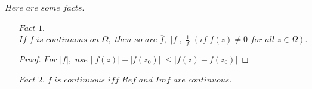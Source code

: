 	\vspace*{2em}
	$Here \,\, are \,\, some \,\, facts.$
	\begin{enumerate}
		\item[$Fact \,\, 1.$] $If \,\, f \,\, is \,\, continuous \,\, on \,\, \Omega , \,\, then \,\, so \,\, are \,\, \overline{f} , \,\, \left| f \right| , \,\, \frac{1}{f} \,\, (if \,\, f(z) \neq 0 \,\, for \,\, all \,\, z \in \Omega).$
		\begin{proof}
			$For \,\, \left| f \right| , \,\, use \,\, \left| \left| f(z) \right| - \left| f(z_0) \right| \right| \leq \left| f(z) - f(z_0) \right|$
		\end{proof}
	
		\item[$Fact \,\, 2.$]$f \,\, is \,\, continuous \,\, iff \,\, Ref \,\, and \,\, Imf \,\, are \,\, continuous.$
	\end{enumerate}

